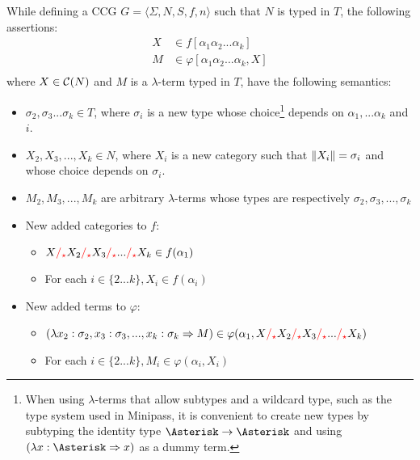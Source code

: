 \documentclass[main.tex]{subfiles}
\begin{document}
\begin{convention}
    \label{hack:phrases}

    While defining a CCG $G = \langle \Sigma, N, S, f, n \rangle$ such that
    $N$ is typed in $T$,
    the following assertions:
    \begin{align*}
        X &\in f[\alpha_1 \alpha_2 ... \alpha_k] \\
        M &\in \varphi[\alpha_1 \alpha_2 ... \alpha_k, X] \\
    \end{align*}
    where $X \in \mathcal{C}( N )$ and $M$ is a $\lambda$-term typed in $T$, have
    the following semantics:
    \begin{itemize}
        \item $\sigma_2, \sigma_3 ... \sigma_k \in T$, where $\sigma_i$ is a new type
            whose choice\footnote{
                When using $\lambda$-terms that allow subtypes and a wildcard type,
                such as the type system used in Minipass, it is
                convenient to create new types by subtyping the identity type
                $\wildcard \tot \wildcard$ and using
                $(\lambda x: \wildcard \abstr x)$ as a dummy term.
            }
            depends on $\alpha_1, ... \alpha_k$ and $i$.
        \item $X_2, X_3, ..., X_k \in N$, where $X_i$ is a new category
            such that $\|X_i\| = \sigma_i$ and whose choice
            depends on $\sigma_i$.
        \item $M_2, M_3, ..., M_k$ are arbitrary $\lambda$-terms whose types are
            respectively $\sigma_2, \sigma_3, ..., \sigma_k$
        \item New added categories to $f$:
            \begin{itemize}
                \item $X \textcolor{red}{/_{\star}} X_2 \textcolor{red}{/_{\star}} X_3
                    \textcolor{red}{/_{\star}} ... \textcolor{red}{/_{\star}} X_k \in f(\alpha_1)$
                \item For each $i \in \{ 2 ... k \}, X_i \in f(\alpha_i)$
            \end{itemize}
        \item New added terms to $\varphi$:
            \begin{itemize}
                \item $(\lambda x_2: \sigma_2, x_3: \sigma_3, ..., x_k: \sigma_k \Rightarrow
                    M) \in \varphi(\alpha_1, X \textcolor{red}{/_{\star}} X_2 \textcolor{red}{/_{\star}} X_3
                    \textcolor{red}{/_{\star}} ... \textcolor{red}{/_{\star}} X_k)$
                \item For each $i \in \{ 2 ... k \}, M_i \in \varphi(\alpha_i, X_i)$
            \end{itemize}
    \end{itemize}
\end{convention}
\end{document}
